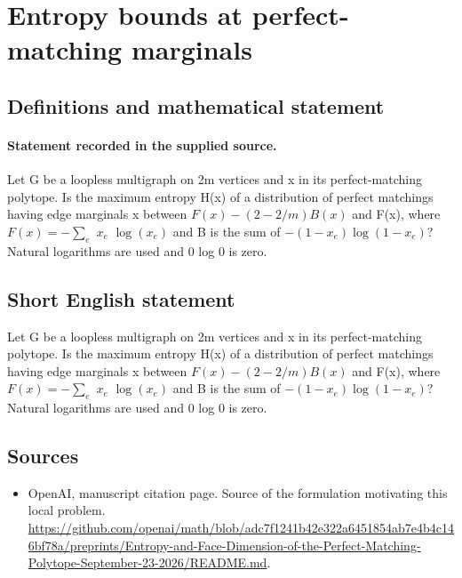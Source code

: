 \documentclass[11pt]{article}
\begin{document}
\section*{Entropy bounds at perfect-matching marginals}\label{30007474}
\subsection{Definitions and mathematical statement}
\paragraph{Statement recorded in the supplied source.}
Let G be a loopless multigraph on 2m vertices and x in its perfect-matching polytope. Is the maximum entropy H(x) of a distribution of perfect matchings having edge marginals x between $F(x)-(2-2/m)B(x)$ and F(x), where $F(x)=-\sum _e$ $x_e$ $\log (x_e)$ and B is the sum of $-(1-x_e)\log (1-x_e)$? Natural logarithms are used and 0 log 0 is zero.
\subsection{Short English statement}
Let G be a loopless multigraph on 2m vertices and x in its perfect-matching polytope. Is the maximum entropy H(x) of a distribution of perfect matchings having edge marginals x between $F(x)-(2-2/m)B(x)$ and F(x), where $F(x)=-\sum _e$ $x_e$ $\log (x_e)$ and B is the sum of $-(1-x_e)\log (1-x_e)$? Natural logarithms are used and 0 log 0 is zero.
\subsection{Sources}
\begin{itemize}
\item[S1] OpenAI, manuscript citation page. Source of the formulation motivating this local problem.
\url{https://github.com/openai/math/blob/adc7f1241b42e322a6451854ab7e4b4c146bf78a/preprints/Entropy-and-Face-Dimension-of-the-Perfect-Matching-Polytope-September-23-2026/README.md}.
\end{itemize}
\end{document}
